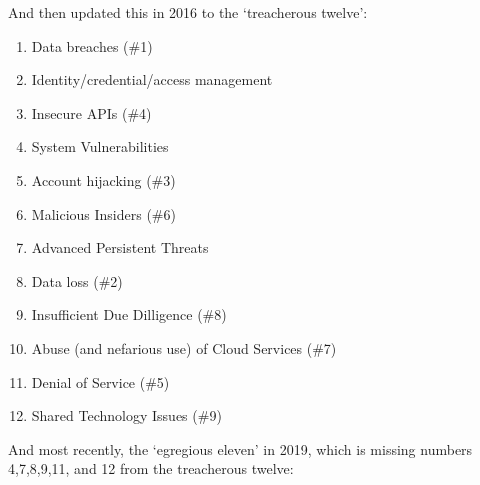 \documentclass[11pt,a4paper,titlepage,dvipsnames,cmyk]{scrartcl}
\begin{document}
And then updated this in 2016 to the `treacherous twelve':
\begin{enumerate}
\item Data breaches (\#1)
\item {\color{red} Identity/credential/access management}
\item Insecure APIs (\#4)
\item {\color{red}System Vulnerabilities}
\item Account hijacking (\#3)
\item Malicious Insiders (\#6)
\item {\color{red}Advanced Persistent Threats}
\item Data loss (\#2)
\item Insufficient Due Dilligence (\#8)
\item Abuse (and nefarious use) of Cloud Services (\#7)
\item Denial of Service (\#5)
\item Shared Technology Issues (\#9)
\end{enumerate}

And most recently, the `egregious eleven' in 2019, which is missing numbers 4,7,8,9,11, and 12 from the treacherous twelve:
\end{document}
